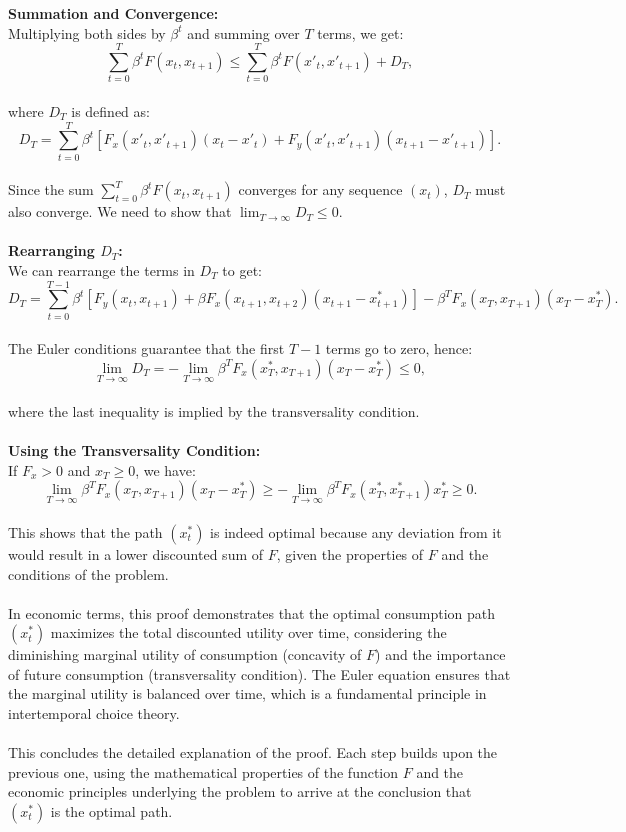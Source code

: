 \documentclass[12pt]{extarticle}
\begin{document}
\newpage
\textbf{Summation and Convergence:}\\
Multiplying both sides by $ \beta^t $ and summing over $ T $ terms, we get:
$$
\sum_{t=0}^{T} \beta^t F(x_t, x_{t+1}) \leq \sum_{t=0}^{T} \beta^t F(x'_t, x'_{t+1}) + D_T,
$$\\
where $ D_T $ is defined as:
$$
D_T = \sum_{t=0}^{T} \beta^t \left[ F_x(x'_t, x'_{t+1})(x_t - x'_t) + F_y(x'_t, x'_{t+1})(x_{t+1} - x'_{t+1}) \right].
$$\\
Since the sum $ \sum_{t=0}^{T} \beta^t F(x_t, x_{t+1}) $ converges for any sequence $ (x_t) $, $ D_T $ must also converge. We need to show that $ \lim_{T \to \infty} D_T \leq 0 $.\\\\
\textbf{Rearranging $ D_T $:}\\
We can rearrange the terms in $ D_T $ to get:
$$
D_T = \sum_{t=0}^{T-1} \beta^t \left[ F_y(x_t, x_{t+1}) + \beta F_x(x_{t+1}, x_{t+2})(x_{t+1} - x^*_{t+1}) \right] - \beta^T F_x(x_T, x_{T+1})(x_T - x^*_T).
$$\\
The Euler conditions guarantee that the first $ T - 1 $ terms go to zero, hence:
$$
\lim_{T \to \infty} D_T = - \lim_{T \to \infty} \beta^T F_x(x^*_T, x_{T+1})(x_T - x^*_T) \leq 0,
$$\\
where the last inequality is implied by the transversality condition.\\\\
\textbf{Using the Transversality Condition:}\\
If $ F_x > 0 $ and $ x_T \geq 0 $, we have:
$$
\lim_{T \to \infty} \beta^T F_x(x_T, x_{T+1})(x_T - x^*_T) \geq - \lim_{T \to \infty} \beta^T F_x(x^*_T, x^*_{T+1})x^*_T \geq 0.
$$\\
This shows that the path $ (x^*_t) $ is indeed optimal because any deviation from it would result in a lower discounted sum of $ F $, given the properties of $ F $ and the conditions of the problem.\\\\
In economic terms, this proof demonstrates that the optimal consumption path $ (x^*_t) $ maximizes the total discounted utility over time, considering the diminishing marginal utility of consumption (concavity of $ F $) and the importance of future consumption (transversality condition). The Euler equation ensures that the marginal utility is balanced over time, which is a fundamental principle in intertemporal choice theory.\\\\
This concludes the detailed explanation of the proof. Each step builds upon the previous one, using the mathematical properties of the function $ F $ and the economic principles underlying the problem to arrive at the conclusion that $ (x^*_t) $ is the optimal path.\\\\
\end{document}
